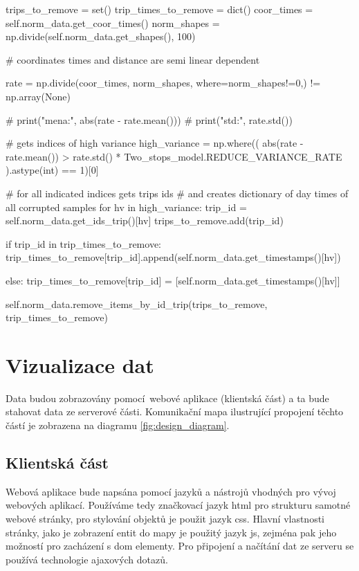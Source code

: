 \begin{code}[frame=none]
trips_to_remove = set()
trip_times_to_remove = dict()
coor_times = self.norm_data.get_coor_times()
norm_shapes = np.divide(self.norm_data.get_shapes(), 100)

# coordinates times and distance are semi linear dependent

rate = np.divide(coor_times, norm_shapes, where=norm_shapes!=0,) != np.array(None)

# print("mena:", abs(rate - rate.mean()))
# print("std:", rate.std())

# gets indices of high variance
high_variance = np.where((
    abs(rate - rate.mean()) > rate.std() * Two_stops_model.REDUCE_VARIANCE_RATE
  ).astype(int) == 1)[0]

# for all indicated indices gets trips ids
# and creates dictionary of day times of all corrupted samples
for hv in high_variance:
  trip_id = self.norm_data.get_ids_trip()[hv]
  trips_to_remove.add(trip_id)

  if trip_id in trip_times_to_remove:
    trip_times_to_remove[trip_id].append(self.norm_data.get_timestamps()[hv])

  else:
    trip_times_to_remove[trip_id] = [self.norm_data.get_timestamps()[hv]]

self.norm_data.remove_items_by_id_trip(trips_to_remove, trip_times_to_remove)
\end{code}

\section{Vizualizace dat}

Data budou zobrazovány pomocí webové aplikace (klientská část) a ta bude stahovat data ze serverové části. Komunikační mapa ilustrující propojení těchto částí je zobrazena na diagramu \ref{fig:design_diagram}.

\subsection{Klientská část}

Webová aplikace bude napsána pomocí jazyků a nástrojů vhodných pro vývoj webových aplikací. Používáme tedy značkovací jazyk \gls{html} pro strukturu samotné webové stránky, pro stylování objektů je použit jazyk \gls{css}. Hlavní vlastnosti stránky, jako je zobrazení entit do mapy je použitý jazyk \gls{js}, zejména pak jeho možností pro zacházení s \gls{dom} elementy. Pro připojení a načítání dat ze serveru se používá technologie \gls{ajax}ových dotazů.

